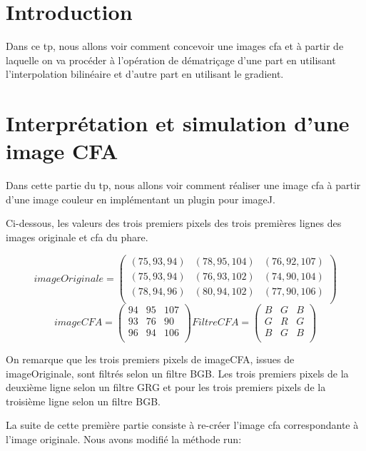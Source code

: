 \documentclass[a4paper,12pt]{report}
\begin{document}


\setcounter{page}{1} 
\newpage

\section*{Introduction}
Dans ce tp, nous allons voir comment concevoir une images cfa et à partir de laquelle on va procéder à l'opération de dématriçage d'une part en utilisant l'interpolation bilinéaire et d'autre part en utilisant le gradient. 
\section*{Interprétation et simulation d'une image CFA}
Dans cette partie du tp, nous allons voir comment réaliser une image cfa à partir d'une image couleur en implémentant un plugin pour imageJ.

Ci-dessous, les valeurs des trois premiers pixels des trois premières lignes des images originale et cfa du phare.
\begin{center}
\[
	imageOriginale=\left (
	\begin{array}{ccc}
		(75,93,94) & (78,95,104) & (76,92,107)\\
        (75,93,94) & (76,93,102) & (74,90,104)\\
        (78,94,96) & (80,94,102) & (77,90,106)\\
	\end{array}
	\right )
\]
\[
	imageCFA=\left (
	\begin{array}{ccc}
		94 & 95 & 107\\
        93 & 76 & 90\\
        96 & 94 & 106\\ 
	\end{array}
	\right )	
	FiltreCFA=\left (
	\begin{array}{ccc}
		B & G  & B\\
        G & R  & G\\
        B & G  & B\\ 
	\end{array}
	\right )
\]
\end{center}

On remarque que les trois premiers pixels de imageCFA, issues de imageOriginale, sont filtrés selon un filtre BGB. Les trois premiers pixels de la deuxième ligne selon un filtre GRG et pour les trois premiers pixels de la troisième ligne selon un filtre BGB.

La suite de cette première partie consiste à re-créer l'image cfa correspondante à l'image originale. Nous avons modifié la méthode run:
\end{document}
